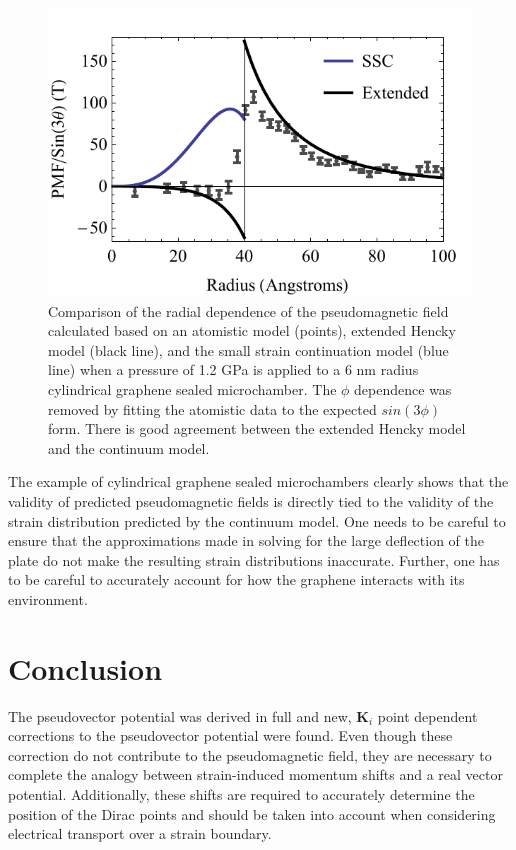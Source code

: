 \begin{figure}
  \begin{center}
  \includegraphics{Figs_PVP/data2_PMF.pdf}
  \end{center}
  \caption[Comparison of pseudomagnetic field calculated based on an atomistic model and based on the extended Hencky model]{\label{fig:PVP:atoms}
    Comparison of the radial dependence of the pseudomagnetic field calculated based on an atomistic model (points), extended Hencky model (black line), and the small strain continuation model (blue line) when a pressure of 1.2 GPa is applied to a 6 nm radius cylindrical graphene sealed microchamber.
    The $\phi$ dependence was removed by fitting the atomistic data to the expected $sin(3 \phi)$ form.
    There is good agreement between the extended Hencky model and the continuum model.
  }
\end{figure}

The example of cylindrical graphene sealed microchambers clearly shows that the validity of predicted pseudomagnetic fields is directly tied to the validity of the strain distribution predicted by the continuum model.
One needs to be careful to ensure that the approximations made in solving for the large deflection of the plate do not make the resulting strain distributions inaccurate.
Further, one has to be careful to accurately account for how the graphene interacts with its environment.

\section{Conclusion}
The pseudovector potential was derived in full and new, $\bm{K}_i$ point dependent corrections to the pseudovector potential were found.
Even though these correction do not contribute to the pseudomagnetic field, they are necessary to complete the analogy between strain-induced momentum shifts and a real vector potential.
Additionally, these shifts are required to accurately determine the position of the Dirac points and should be taken into account when considering electrical transport over a strain boundary.

